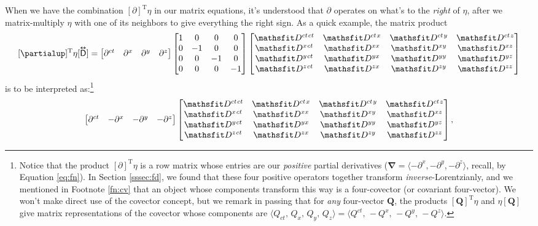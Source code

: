 \documentclass[12pt]{article}
\renewcommand{\vv}[1]{\mathbf{#1}}
\newcommand{\del}{\boldsymbol{\nabla}}
\newcommand{\capdy}[1]{ \overset{ \text{\tiny$\bm\leftrightarrow$} }{\vphantom{\text{\small{A}}}\smash{#1}} }
\begin{document}
When we have the combination $[\partialup]^\mathrm{T} \eta$ in our matrix equations, it's understood that $\partialup$ operates on what's to the \emph{right} of $\eta$, after we matrix-multiply $\eta$ with one of its neighbors to give everything the right sign. As a quick example, the matrix product
\begin{equation*}
\mkern0mu [\partialup]^{\mathrm{T}} \eta [\capdy{\mathsf{D}}]
=
\begin{bmatrix}
\partial^{ct} & \partial^x & \partial^y & \partial^z
\end{bmatrix}
\begin{bmatrix}
1 & 0 & 0 & 0 \\
0 & -1 & 0 & 0 \\
0 & 0 & -1 & 0 \\
0 & 0 & 0 & -1
\end{bmatrix}
\begin{bmatrix}
\mathsfit D^{ct \mkern1.5mu ct} & \mathsfit D^{ct \mkern1.5mu x} & \mathsfit D^{ct \mkern1.5mu y} & \mathsfit D^{ct \mkern1.5mu z} \\
\mathsfit D^{x \mkern1.5mu ct} & \mathsfit D^{x x} & \mathsfit D^{x y} & \mathsfit D^{x z}  \\
\mathsfit D^{y \mkern1.5mu ct} & \mathsfit D^{y x} & \mathsfit D^{y y} & \mathsfit D^{y z}  \\
\mathsfit D^{z \mkern1.5mu ct} & \mathsfit D^{z x} & \mathsfit D^{z y} & \mathsfit D^{z z} 
\end{bmatrix}
\end{equation*}
is to be interpreted as:\footnote{Notice that the product $[\partialup]^\mathrm{T} \eta$ is a row matrix whose entries are our \emph{positive} partial derivatives ($\del = \langle - \partial^x , - \partial^y , - \partial^z \rangle$, recall, by Equation \ref{eq:fn}). In Section \ref{sssec:fd}, we found that these four positive operators together transform \emph{inverse}-Lorentzianly, and we mentioned in Footnote \ref{fn:cv} that an object whose components transform this way is a four-covector (or covariant four-vector). We won't make direct use of the covector concept, but we remark in passing that for \emph{any} four-vector $\vv Q$, the products $[\vv Q]^\mathrm{T} \eta$ and $\eta [\vv Q]$ give matrix representations of the covector whose components are $\langle Q_{ct}, \, Q_x, \, Q_y, \, Q_z \rangle = \langle Q^{ct}, \, -Q^x, \, -Q^y, \, -Q^z \rangle$.}
\begin{equation*}
\begin{bmatrix}
\partial^{ct} & - \partial^x & - \partial^y & -\partial^z
\end{bmatrix}
\begin{bmatrix}
\mathsfit D^{ct \mkern1.5mu ct} & \mathsfit D^{ct \mkern1.5mu x} & \mathsfit D^{ct \mkern1.5mu y} & \mathsfit D^{ct \mkern1.5mu z} \\
\mathsfit D^{x \mkern1.5mu ct} & \mathsfit D^{x x} & \mathsfit D^{x y} & \mathsfit D^{x z}  \\
\mathsfit D^{y \mkern1.5mu ct} & \mathsfit D^{y x} & \mathsfit D^{y y} & \mathsfit D^{y z}  \\
\mathsfit D^{z \mkern1.5mu ct} & \mathsfit D^{z x} & \mathsfit D^{z y} & \mathsfit D^{z z} 
\end{bmatrix},
\end{equation*}
\end{document}
